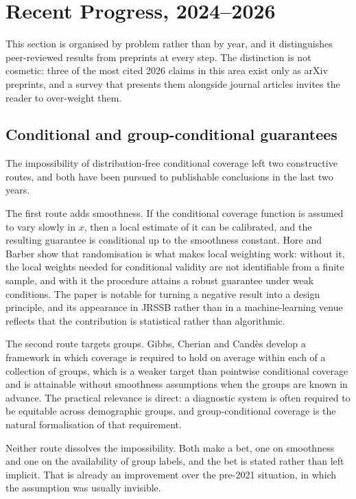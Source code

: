\documentclass[a4paper,longmktitle]{cas-sc}
\begin{document}
\section{Recent Progress, 2024--2026}
\label{sec:recent}

This section is organised by problem rather than by year, and it distinguishes peer-reviewed results from preprints at every step. The distinction is not cosmetic: three of the most cited 2026 claims in this area exist only as arXiv preprints, and a survey that presents them alongside journal articles invites the reader to over-weight them.

\subsection{Conditional and group-conditional guarantees}

The impossibility of distribution-free conditional coverage left two constructive routes, and both have been pursued to publishable conclusions in the last two years.

The first route adds smoothness. If the conditional coverage function is assumed to vary slowly in $x$, then a local estimate of it can be calibrated, and the resulting guarantee is conditional up to the smoothness constant. Hore and Barber \cite{Hore2024} show that randomisation is what makes local weighting work: without it, the local weights needed for conditional validity are not identifiable from a finite sample, and with it the procedure attains a robust guarantee under weak conditions. The paper is notable for turning a negative result into a design principle, and its appearance in JRSSB rather than in a machine-learning venue reflects that the contribution is statistical rather than algorithmic.

The second route targets groups. Gibbs, Cherian and Candès \cite{Gibbs2025} develop a framework in which coverage is required to hold on average within each of a collection of groups, which is a weaker target than pointwise conditional coverage and is attainable without smoothness assumptions when the groups are known in advance. The practical relevance is direct: a diagnostic system is often required to be equitable across demographic groups, and group-conditional coverage is the natural formalisation of that requirement.

Neither route dissolves the impossibility. Both make a bet, one on smoothness and one on the availability of group labels, and the bet is stated rather than left implicit. That is already an improvement over the pre-2021 situation, in which the assumption was usually invisible.
\end{document}
